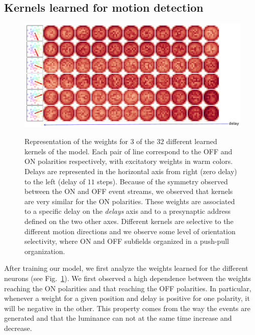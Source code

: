 \documentclass[default]{sn-jnl}%
\theoremstyle{thmstyleone}%
\theoremstyle{thmstyletwo}%
\theoremstyle{thmstylethree}%
\newcommand{\seeFig}[1]{see Fig.~\ref{fig:#1}}%
\begin{document}
\subsection{Kernels learned for motion detection}
\begin{figure}[ht!]
    {\centering
    \includegraphics[width=\linewidth]{figures/motion_kernels.pdf}
    }
    \caption{
    	Representation of the weights for $3$ of the $32$ different learned kernels of the model. Each pair of line correspond to the OFF and ON polarities respectively, with excitatory weights in warm colors. Delays are represented in the horizontal axis from right (zero delay) to the left (delay of $11$ steps). Because of the symmetry observed between the ON and OFF event streams, we observed that kernels are very similar for the ON polarities. These weights are associated to a specific delay on the \textit{delays} axis and to a presynaptic address defined on the two other axes. %
	Different kernels are selective to the different motion directions and we observe some level of orientation selectivity, where ON and OFF subfields organized in a push-pull organization. 
	}
    \label{fig:kernels}
\end{figure} 
%
%
After training our model, we first analyze the weights learned for the different neurons (\seeFig{kernels}). 
We first observed a high dependence between the weights reaching the ON polarities and that reaching the OFF polarities. In particular, whenever a weight for a given position and delay is positive for one polarity, it will be negative in the other. This property comes from the way the events are generated and that the luminance can not at the same time increase and decrease. %
\end{document}
